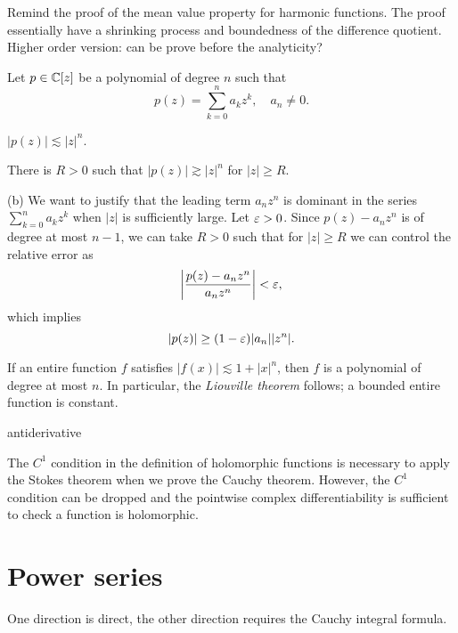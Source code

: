 \documentclass{../../large}
\begin{document}
\begin{prb}
Remind the proof of the mean value property for harmonic functions.
The proof essentially have a shrinking process and boundedness of the difference quotient.
Higher order version: can be prove before the analyticity?
\end{prb}



\begin{prb}
Let $p\in\mathbb{C}[z]$ be a polynomial of degree $n$ such that
\[p(z)=\sum_{k=0}^na_kz^k,\quad a_n\ne0.\]
\begin{parts}
\item $|p(z)|\lesssim|z|^n$.
\item There is $R>0$ such that $|p(z)|\gtrsim|z|^n$ for $|z|\ge R$.
\end{parts}
\end{prb}
\begin{pf}
(b)
We want to justify that the leading term $a_nz^n$ is dominant in the series $\sum_{k=0}^na_kz^k$ when $|z|$ is sufficiently large.
Let $\varepsilon>0$.
Since $p(z)-a_nz^n$ is of degree at most $n-1$, we can take $R>0$ such that for $|z|\ge R$ we can control the relative error as
\[\left|\frac{p(z)-a_nz^n}{a_nz^n}\right|<\varepsilon,\]
which implies
\[|p(z)|\ge(1-\varepsilon)|a_n||z^n|.\]
\end{pf}


\begin{prb}
\begin{parts}
\item If an entire function $f$ satisfies $|f(x)|\lesssim1+|x|^n$, then $f$ is a polynomial of degree at most $n$. In particular, the \emph{Liouville theorem} follows; a bounded entire function is constant.
\end{parts}
\end{prb}

\begin{prb}
antiderivative
\end{prb}

\begin{prb}
The $C^1$ condition in the definition of holomorphic functions is necessary to apply the Stokes theorem when we prove the Cauchy theorem.
However, the $C^1$ condition can be dropped and the pointwise complex differentiability is sufficient to check a function is holomorphic.
\end{prb}


\section{Power series}
\begin{prb}
One direction is direct, the other direction requires the Cauchy integral formula.
\end{prb}
\end{document}
